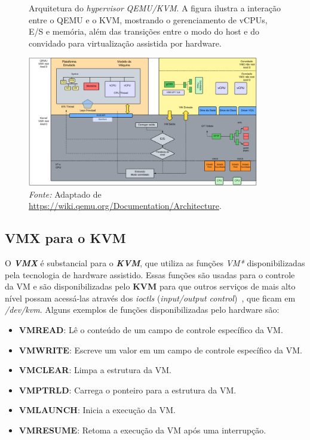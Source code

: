 \begin{figure}[htbp]
  \centering
  \caption{Arquitetura do \textit{hypervisor} \textit{QEMU/KVM}. A figura ilustra a interação entre o QEMU e o KVM, mostrando o gerenciamento de vCPUs, E/S e memória, além das transições entre o modo do host e do convidado para virtualização assistida por hardware.}
  \includegraphics[width=0.9\textwidth]{images/qemu_kvm_architecture.png}
  \caption*{\textit{Fonte:} Adaptado de \url{https://wiki.qemu.org/Documentation/Architecture}.}
  \label{fig:qemu_kvm_architecture}
\end{figure}


\subsection{VMX para o KVM}

O \textit{\textbf{VMX}} é substancial para o \textit{\textbf{KVM}}, que utiliza as funções \textit{VM*} disponibilizadas pela tecnologia de hardware assistido. Essas funções são usadas para o controle da VM e são disponibilizadas pelo \textbf{KVM} para que outros serviços de mais alto nível possam acessá-las através dos \textit{ioctls} (\textit{input/output control})~\citep{wiki:Ioctl}, que ficam em \textit{/dev/kvm}. Alguns exemplos de funções disponibilizadas pelo hardware são:

\begin{itemize}
  \item \textbf{VMREAD}: Lê o conteúdo de um campo de controle específico da VM.
  \item \textbf{VMWRITE}: Escreve um valor em um campo de controle específico da VM.
  \item \textbf{VMCLEAR}: Limpa a estrutura da VM.
  \item \textbf{VMPTRLD}: Carrega o ponteiro para a estrutura da VM.
  \item \textbf{VMLAUNCH}: Inicia a execução da VM.
  \item \textbf{VMRESUME}: Retoma a execução da VM após uma interrupção.
\end{itemize}

